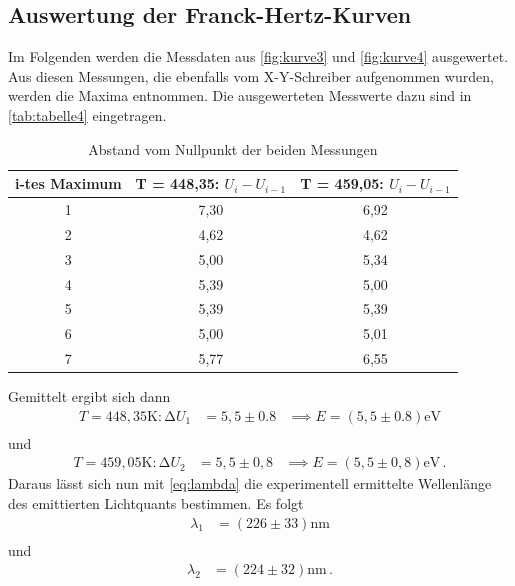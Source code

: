 \subsection{Auswertung der Franck-Hertz-Kurven}

Im Folgenden werden die Messdaten aus \autoref{fig:kurve3} und \autoref{fig:kurve4} ausgewertet.
Aus diesen Messungen, die ebenfalls vom X-Y-Schreiber aufgenommen wurden, werden die Maxima entnommen.
Die ausgewerteten Messwerte dazu sind in \autoref{tab:tabelle4} eingetragen.

\begin{table} [H]
  \centering
  \caption{Abstand vom Nullpunkt der beiden Messungen}
  \label{tab:tabelle4}
  \begin{tabular}{c c c}
      \toprule
      i-tes Maximum &  T = 448,35: $U_i - U_{i-1}$ & T = 459,05: $U_i - U_{i-1}$\\
      \midrule 
      1 & 7,30 & 6,92 \\
      2 & 4,62 & 4,62 \\
      3 & 5,00 & 5,34 \\
      4 & 5,39 & 5,00 \\
      5 & 5,39 & 5,39 \\
      6 & 5,00 & 5,01 \\
      7 & 5,77 & 6,55 \\
      \bottomrule
  \end{tabular}
\end{table}


Gemittelt ergibt sich dann
\begin{align*}
  T = 448,35 \unit\K: \increment U_1 &= 5,5 \pm 0.8  &\implies E = (5,5 \pm 0.8)\unit\eV \\
\end{align*}
und 
\begin{align*}
  T = 459,05 \unit\K: \increment U_2 &= 5,5 \pm 0,8  &\implies E = (5,5 \pm 0,8)\unit\eV \, .
\end{align*}
Daraus lässt sich nun mit \autoref{eq:lambda} die experimentell ermittelte Wellenlänge des emittierten Lichtquants bestimmen.
Es folgt
\begin{align*}
  \lambda_1 &= (226 \pm 33) \unit\nm \\
\end{align*}
und
\begin{align*}
  \lambda_2 &= (224 \pm 32) \unit\nm \, .
\end{align*}